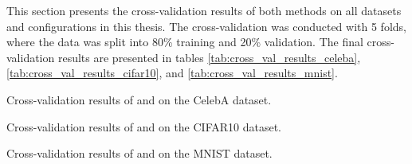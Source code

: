 This section presents the cross-validation results of both methods on all datasets and configurations in this thesis. The cross-validation was conducted with 5 folds, where the data was split into 80\% training and 20\% validation. The final cross-validation results are presented in tables \ref{tab:cross_val_results_celeba}, \ref{tab:cross_val_results_cifar10}, and \ref{tab:cross_val_results_mnist}.

\begin{table}[H]
    
    \caption{Cross-validation results of  and  on the CelebA dataset.}
    \label{tab:cross_val_results_celeba}
\end{table}
\begin{table}
    
    \caption{Cross-validation results of  and  on the CIFAR10 dataset.}
    \label{tab:cross_val_results_cifar10}
\end{table}

\begin{table}
    
    \caption{Cross-validation results of  and  on the MNIST dataset.}
    \label{tab:cross_val_results_mnist}
\end{table}